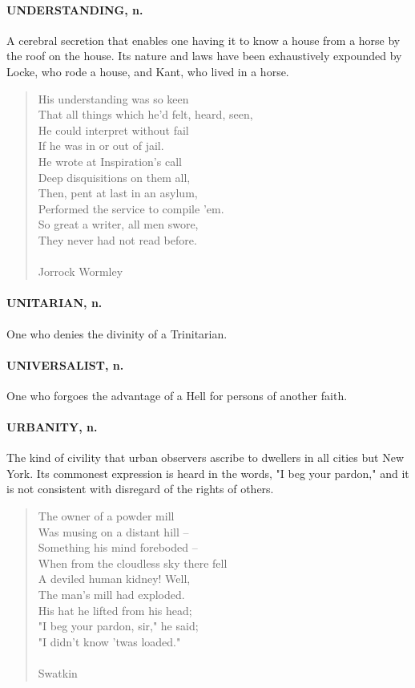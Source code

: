 \documentclass[11pt]{article}
\begin{document}
\paragraph{UNDERSTANDING, n.}  A cerebral secretion that enables one having it to
know a house from a horse by the roof on the house.  Its nature and
laws have been exhaustively expounded by Locke, who rode a house, and
Kant, who lived in a horse.

\begin{quote}   His understanding was so keen \\
  That all things which he'd felt, heard, seen, \\
  He could interpret without fail \\
  If he was in or out of jail. \\
  He wrote at Inspiration's call \\
  Deep disquisitions on them all, \\
  Then, pent at last in an asylum, \\
  Performed the service to compile 'em. \\
  So great a writer, all men swore, \\
  They never had not read before. \\
 \\
Jorrock Wormley \end{quote}


\paragraph{UNITARIAN, n.}  One who denies the divinity of a Trinitarian.

\paragraph{UNIVERSALIST, n.}  One who forgoes the advantage of a Hell for persons
of another faith.

\paragraph{URBANITY, n.}  The kind of civility that urban observers ascribe to
dwellers in all cities but New York.  Its commonest expression is
heard in the words, "I beg your pardon," and it is not consistent with
disregard of the rights of others.

\begin{quote}   The owner of a powder mill \\
  Was musing on a distant hill -- \\
      Something his mind foreboded -- \\
  When from the cloudless sky there fell \\
  A deviled human kidney!  Well, \\
      The man's mill had exploded. \\
  His hat he lifted from his head; \\
  "I beg your pardon, sir," he said; \\
      "I didn't know 'twas loaded." \\
 \\
Swatkin \end{quote}
\end{document}
